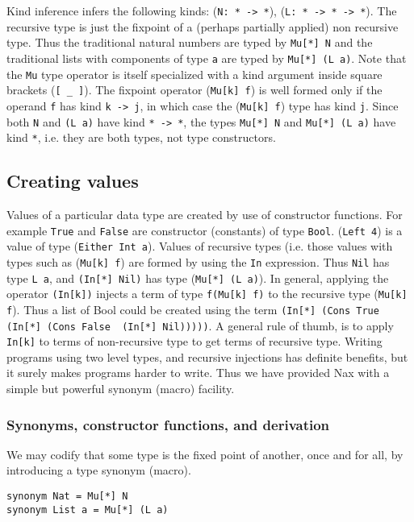 Kind inference infers the following kinds:
(\verb+N: * -> *+),  (\verb+L: * -> * -> *+). 
The recursive type is just the fixpoint of a (perhaps partially applied)
non recursive type. Thus the traditional natural numbers are typed by \verb+Mu[*] N+
and the traditional lists with components of type \verb+a+ are typed by
\verb+Mu[*] (L a)+.  Note that the \verb+Mu+ type operator is itself specialized with a kind argument inside
square brackets (\verb+[ _ ]+). The fixpoint operator (\verb+Mu[k] f+) is well formed only
if the operand \verb+f+ has kind \verb+k -> j+, in which case the (\verb+Mu[k] f+) type
has kind \verb+j+. Since both \verb+N+ and \verb+(L a)+ have kind \verb+* -> *+,
the types  \verb+Mu[*] N+ and \verb+Mu[*] (L a)+ have kind \verb+*+, i.e. they 
are both types, not type constructors.

\subsection{Creating values}

Values of a particular data type are created by use of constructor functions. For
example \verb+True+ and \verb+False+ are constructor (constants) of type \verb+Bool+.
(\verb+Left 4+) is a value of type (\verb+Either Int a+). Values of recursive types
(i.e. those values with types such as (\verb+Mu[k] f+) are formed by using the \verb+In+
expression. Thus \verb+Nil+ has type \verb+L a+, and \verb+(In[*] Nil)+ has type
(\verb+Mu[*] (L a)+). In general, applying the operator \verb+(In[k])+ injects a term of
type \verb+f(Mu[k] f)+ to the recursive type (\verb+Mu[k] f+). Thus a list of Bool could be
created using the term \verb+(In[*] (Cons True  (In[*] (Cons False  (In[*] Nil)))))+. 
A general rule of thumb, is to apply \verb+In[k]+ to terms of non-recursive type
to get terms of recursive type. Writing programs using two level types, and recursive
injections has definite benefits, but it surely makes programs harder to write. Thus
we have provided Nax with a simple but powerful synonym (macro) facility.

\subsubsection{Synonyms, constructor functions, and derivation}

We may codify that some type is the fixed point of another, once and for all, by introducing
a type synonym (macro).

{\small
\begin{verbatim}
synonym Nat = Mu[*] N
synonym List a = Mu[*] (L a)     
\end{verbatim}}

